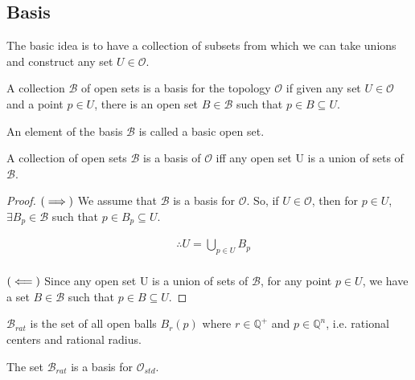 \subsection*{Basis}

The basic idea is to have a collection of subsets from which we can take unions and construct any set $ U \in \mathcal{O}$.

\begin{definition}
    A collection $ \mathcal{B}$ of open sets is a basis for the topology $ \mathcal{O}$ if given any set $ U \in \mathcal{O}$ and a point $ p \in U$, there is an open set $ B \in \mathcal{B}$ such that $ p \in B \subseteq U$.
\end{definition}

An element of the basis $ \mathcal{B}$ is called a basic open set.

\begin{theorem}
    A collection of open sets $ \mathcal{B}$ is a basis of $ \mathcal{O}$ iff any open set U is a union of sets of $ \mathcal{B}$.
\end{theorem}

\begin{proof}
    $ \left(  \implies \right)$ We assume that $ \mathcal{B}$ is a basis for $ \mathcal{O}$. So, if $ U \in \mathcal{O}$, then for $ p \in U$, $ \exists B_p \in \mathcal{B}$ such that $ p \in B_p \subseteq U$.

    \begin{align*}
        & \therefore U = \bigcup_{p \in U} B_p \\
    \end{align*}

    $ \left(  \impliedby \right)$ Since any open set U is a union of sets of $ \mathcal{B}$, for any point $ p \in U$, we have a set $ B \in \mathcal{B}$ such that $ p \in B \subseteq U$.
\end{proof}

$ \mathcal{B}_{rat}$ is the set of all open balls $ B_r(p)$ where $ r \in \mathbb{Q}^+$ and $ p \in \mathbb{Q}^n$, i.e. rational centers and rational radius.

\begin{theorem}
    The set $ \mathcal{B}_{rat}$ is a basis for $ \mathcal{O}_{std}$.
\end{theorem}

